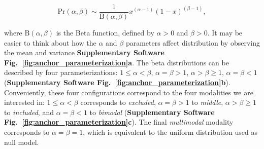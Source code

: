 \begin{equation}
\mathrm{Pr}(\alpha, \beta) \sim \frac{1}{\mathrm{B}\left(\alpha, \beta\right)}  x^{(\alpha - 1)} \left(1-x\right)^{(\beta-1)},
\end{equation}

where $\mathrm{B}\left(\alpha, \beta\right)$ is the Beta function, defined by $\alpha > 0$ and $\beta > 0$. It may be easier to think about how the $\alpha$ and $\beta$ parameters affect distribution by observing the mean and variance \textbf{Supplementary Software Fig.~\ref{fig:anchor_parameterization}a}. The beta distributions can be described by four parameterizations: $1 \leq \alpha < \beta$, $\alpha = \beta > 1$, $\alpha > \beta \geq 1$, $\alpha = \beta < 1$ (\textbf{Supplementary Software Fig.~\ref{fig:anchor_parameterization}b}). Conveniently, these four configurations correspond to the four modalities we are interested in: $1 \leq \alpha < \beta$ corresponds to \emph{excluded}, $\alpha = \beta > 1$ to \emph{middle}, $\alpha > \beta \geq 1$ to \emph{included}, and $\alpha = \beta < 1$ to \emph{bimodal} (\textbf{Supplementary Software Fig.~\ref{fig:anchor_parameterization}c}). The final \emph{multimodal} modality corresponds to $\alpha = \beta = 1$, which is equivalent to the uniform distribution used as null model.







